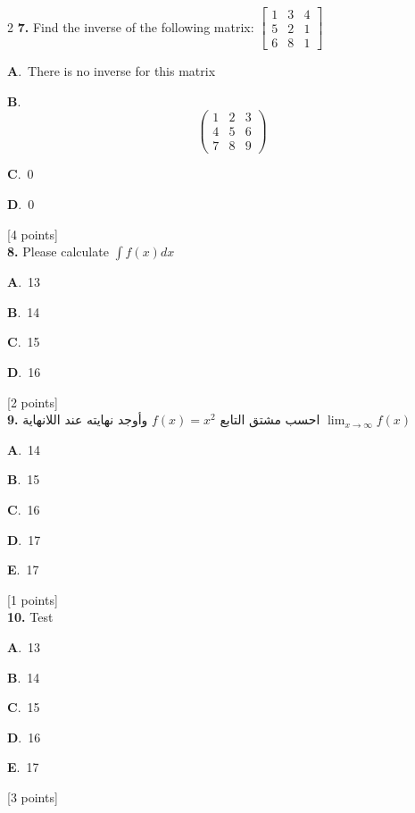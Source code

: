 \documentclass[12pt]{article}
\newcommand{\choice}[3]{%
  \noindent\textbf{#1}.~#2\hfill#3\par\vspace{0.25em}
}
\begin{document}
\begin{multicols}{2}
\noindent \textbf{\textenglish{7.}} {\textenglish{Find the inverse of the following matrix: }}\(\begin{bmatrix} 1 & 3 & 4 \\ 5 & 2 & 1 \\ 6 & 8 & 1 \end{bmatrix}\)

\noindent\choice{A}{{\textenglish{There is no inverse for this matrix}}}{}
\noindent\choice{B}{\[\begin{pmatrix} 1 & 2 & 3 \\ 4 & 5 & 6 \\ 7 & 8 & 9  \end{pmatrix}\]}{}
\noindent\choice{C}{{\textenglish{0}}}{}
\noindent\choice{D}{{\textenglish{0}}}{}
\hfill {\textenglish{[4 points]}}\\[0.5em]

\noindent \textbf{\textenglish{8.}} {\textenglish{Please calculate }}\(\int f(x)dx\)

\noindent\choice{A}{{\textenglish{13}}}{}
\noindent\choice{B}{{\textenglish{14}}}{}
\noindent\choice{C}{{\textenglish{15}}}{}
\noindent\choice{D}{{\textenglish{16}}}{}
\hfill {\textenglish{[2 points]}}\\[0.5em]

\noindent \textbf{\textenglish{9.}} {\textarabic{احسب مشتق التابع }}\( f(x) = x^2\){\textarabic{ وأوجد نهايته عند اللانهاية }}\(\lim_{x \to \infty}f(x)\)

\noindent\choice{A}{{\textenglish{14}}}{}
\noindent\choice{B}{{\textenglish{15}}}{}
\noindent\choice{C}{{\textenglish{16}}}{}
\noindent\choice{D}{{\textenglish{17}}}{}
\noindent\choice{E}{{\textenglish{17}}}{}
\hfill {\textenglish{[1 points]}}\\[0.5em]

\noindent \textbf{\textenglish{10.}} {\textenglish{Test}}

\noindent\choice{A}{{\textenglish{13}}}{}
\noindent\choice{B}{{\textenglish{14}}}{}
\noindent\choice{C}{{\textenglish{15}}}{}
\noindent\choice{D}{{\textenglish{16}}}{}
\noindent\choice{E}{{\textenglish{17}}}{}
\hfill {\textenglish{[3 points]}}\\[0.5em]


\end{multicols}
\end{document}
